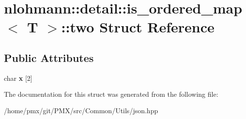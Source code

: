 \hypertarget{structnlohmann_1_1detail_1_1is__ordered__map_1_1two}{}\section{nlohmann\+:\+:detail\+:\+:is\+\_\+ordered\+\_\+map$<$ T $>$\+:\+:two Struct Reference}
\label{structnlohmann_1_1detail_1_1is__ordered__map_1_1two}
\subsection*{Public Attributes}
\begin{DoxyCompactItemize}
\item 
\mbox{\label{structnlohmann_1_1detail_1_1is__ordered__map_1_1two_a598855e1ccaedb301c6011de1dce6f47}} 
char {\bfseries x} \mbox{[}2\mbox{]}
\end{DoxyCompactItemize}


The documentation for this struct was generated from the following file\+:\begin{DoxyCompactItemize}
\item 
/home/pmx/git/\+P\+M\+X/src/\+Common/\+Utils/json.\+hpp\end{DoxyCompactItemize}
